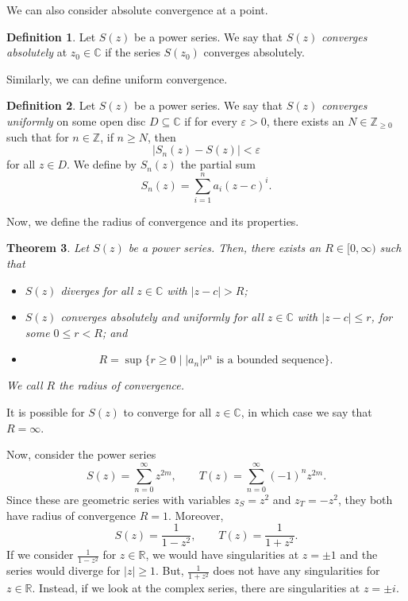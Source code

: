 \documentclass[a4paper, openany]{memoir}
\theoremstyle{definition}
\newtheorem{definition}{Definition}[section]
\theoremstyle{plain}
\newtheorem{theorem}[definition]{Theorem}
\begin{document}
We can also consider absolute convergence at a point.
\begin{definition}
Let $S(z)$ be a power series. We say that $S(z)$ \emph{converges absolutely} at $z_0 \in \mathbb{C}$ if the series $S(z_0)$ converges absolutely.
\end{definition}
\noindent Similarly, we can define uniform convergence.
\begin{definition}
Let $S(z)$ be a power series. We say that $S(z)$ \emph{converges uniformly} on some open disc $D \subseteq \mathbb{C}$ if for every $\varepsilon > 0$, there exists an $N \in \mathbb{Z}_{\geq 0}$ such that for $n \in \mathbb{Z}$, if $n \geq N$, then
\[|S_n(z) - S(z)| < \varepsilon\]
for all $z \in D$. We define by $S_n(z)$ the partial sum
\[S_n(z) = \sum_{i=1}^n a_i(z - c)^i.\]
\end{definition}

Now, we define the radius of convergence and its properties.
\begin{theorem}
Let $S(z)$ be a power series. Then, there exists an $R \in [0, \infty)$ such that
\begin{itemize}
    \item $S(z)$ diverges for all $z \in \mathbb{C}$ with $|z - c| > R$;
    \item $S(z)$ converges absolutely and uniformly for all $z \in \mathbb{C}$ with $|z - c| \leq r$, for some $0 \leq r < R$; and
    \item \[R = \sup \{r \geq 0 \mid |a_n| r^n \text{ is a bounded sequence}\}.\]
\end{itemize}
We call $R$ the \emph{radius of convergence}.
\end{theorem}
\noindent It is possible for $S(z)$ to converge for all $z \in \mathbb{C}$, in which case we say that $R = \infty$.

Now, consider the power series
\[S(z) = \sum_{n=0}^\infty z^{2m}, \qquad T(z) = \sum_{n=0}^{\infty} (-1)^n z^{2m}.\]
Since these are geometric series with variables $z_S = z^2$ and $z_T = -z^2$, they both have radius of convergence $R = 1$. Moreover,
\[S(z) = \frac{1}{1 - z^2}, \qquad T(z) = \frac{1}{1 + z^2}.\]
If we consider $\frac{1}{1 - z^2}$ for $z \in \mathbb{R}$, we would have singularities at $z = \pm 1$ and the series would diverge for $|z| \geq 1$. But, $\frac{1}{1 + z^2}$ does not have any singularities for $z \in \mathbb{R}$. Instead, if we look at the complex series, there are singularities at $z = \pm i$.
\end{document}
